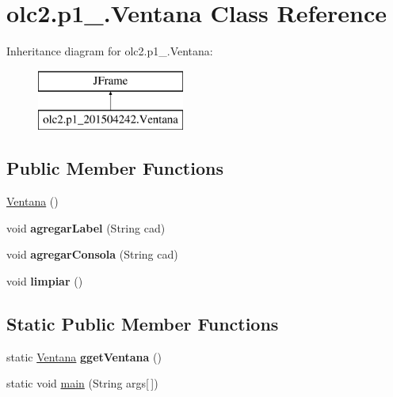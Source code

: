 \hypertarget{classolc2_1_1p1__201504242_1_1_ventana}{}\section{olc2.\+p1\+\_.\+Ventana Class Reference}
\label{classolc2_1_1p1__201504242_1_1_ventana}
Inheritance diagram for olc2.\+p1\+\_.\+Ventana\+:\begin{figure}[H]
\begin{center}
\leavevmode
\includegraphics[height=2.000000cm]{classolc2_1_1p1__201504242_1_1_ventana}
\end{center}
\end{figure}
\subsection*{Public Member Functions}
\begin{DoxyCompactItemize}
\item 
\mbox{\hyperlink{classolc2_1_1p1__201504242_1_1_ventana_af29a17e75dff62d1fe1fe4727989b63a}{Ventana}} ()
\item 
\mbox{\label{classolc2_1_1p1__201504242_1_1_ventana_a10616d9a5ee1a9a6d8c30025c77cf097}} 
void {\bfseries agregar\+Label} (String cad)
\item 
\mbox{\label{classolc2_1_1p1__201504242_1_1_ventana_a3a50772014c6d0f0af4a17225b8be4dd}} 
void {\bfseries agregar\+Consola} (String cad)
\item 
\mbox{\label{classolc2_1_1p1__201504242_1_1_ventana_a13bbd13ef2ef35ddf0f58084bf603dd0}} 
void {\bfseries limpiar} ()
\end{DoxyCompactItemize}
\subsection*{Static Public Member Functions}
\begin{DoxyCompactItemize}
\item 
\mbox{\label{classolc2_1_1p1__201504242_1_1_ventana_a3281e96c7bc31ff8986f9e4ee858672d}} 
static \mbox{\hyperlink{classolc2_1_1p1__201504242_1_1_ventana}{Ventana}} {\bfseries gget\+Ventana} ()
\item 
static void \mbox{\hyperlink{classolc2_1_1p1__201504242_1_1_ventana_a8ec2c001f5d8f7f18fd9da6429e0e3c0}{main}} (String args\mbox{[}$\,$\mbox{]})
\end{DoxyCompactItemize}
